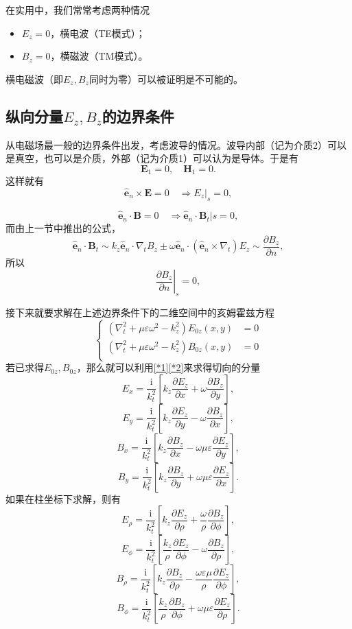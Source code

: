 \documentclass[UTF8]{ctexbook}
\renewcommand{\b}{\boldsymbol}
\renewcommand{\i}{\mathrm{i}}
\numberwithin{equation}{chapter}
\begin{document}
	在实用中，我们常常考虑两种情况
	\begin{itemize}
		\item $E_z=0$，横电波（TE模式）；
		\item $B_z=0$，横磁波（TM模式）。
	\end{itemize}
	横电磁波（即$E_z,B_z$同时为零）可以被证明是不可能的。
	
	\subsection{纵向分量$E_z,B_z$的边界条件}
	从电磁场最一般的边界条件出发，考虑波导的情况。波导内部（记为介质2）可以是真空，也可以是介质，外部（记为介质1）可以认为是导体。于是有
	\[\b{E}_1=0,\quad \b{H}_1=0.\]
	这样就有
	\[\hat{\b{e}}_n\times\b{E}=0\quad \Rightarrow E_z|_s=0,\]
	
	\[\hat{\b{e}}_n\cdot\b{B}=0\quad \Rightarrow \hat{\b{e}}_n\cdot\b{B}_t|s=0,\]
	而由上一节中推出的公式，
	\[\hat{\b{e}}_n\cdot\b{B}_t\sim k_z\hat{\b{e}}_n\cdot\nabla_t B_z\pm\omega\hat{\b{e}}_n\cdot(\hat{\b{e}}_n\times\nabla_t)E_z \sim \frac{\partial B_z}{\partial n},\]
	所以
	\[\left.\frac{\partial B_z}{\partial n}\right|_s=0,\]
	
	接下来就要求解在上述边界条件下的二维空间中的亥姆霍兹方程
	\[\left\{\begin{aligned}
		(\nabla^2_t+\mu\varepsilon\omega^2-k_z^2)E_{0z}(x,y)&=0 \\
		(\nabla^2_t+\mu\varepsilon\omega^2-k_z^2)B_{0z}(x,y)&=0 \\
	\end{aligned}\right.\]
	若已求得$E_{0z},B_{0z}$，那么就可以利用\ref{*1}\ref{*2}来求得切向的分量
	\[E_x=\frac{\i}{k_t^2}\left[k_z\frac{\partial E_z}{\partial x}+\omega\frac{\partial B_z}{\partial y}\right],\]
	\[E_y=\frac{\i}{k_t^2}\left[k_z\frac{\partial E_z}{\partial y}-\omega\frac{\partial B_z}{\partial x}\right],\]
	\[B_x=\frac{\i}{k_t^2}\left[k_z\frac{\partial B_z}{\partial x}-\omega\mu\varepsilon\frac{\partial E_z}{\partial y}\right],\]
	\[B_y=\frac{\i}{k_t^2}\left[k_z\frac{\partial B_z}{\partial y}+\omega\mu\varepsilon\frac{\partial E_z}{\partial x}\right].\]
	如果在柱坐标下求解，则有
	\[E_\rho=\frac{\i}{k_t^2}\left[k_z\frac{\partial E_z}{\partial \rho}+\frac{\omega}{\rho}\frac{\partial B_z}{\partial \phi}\right],\]
	\[E_\phi=\frac{\i}{k_t^2}\left[\frac{k_z}{\rho}\frac{\partial E_z}{\partial \phi}-\omega\frac{\partial B_z}{\partial \rho}\right],\]
	\[B_\rho=\frac{\i}{k_t^2}\left[k_z\frac{\partial B_z}{\partial \rho}-\frac{\omega\varepsilon\mu}{\rho}\frac{\partial E_z}{\partial \phi}\right],\]
	\[B_\phi=\frac{\i}{k_t^2}\left[\frac{k_z}{\rho}\frac{\partial B_z}{\partial \phi}+\omega\mu\varepsilon\frac{\partial E_z}{\partial \rho}\right].\]
	
\end{document}
